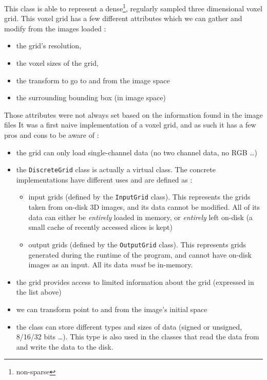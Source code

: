 {{		\vspace{\baselineskip}

		This class is able to represent a dense\footnote{non-sparse}, regularly sampled three dimensional voxel grid. This voxel grid has a few different attributes which we can gather and modify from the images loaded :\begin{itemize}
			\item the grid's resolution,
			\item the voxel sizes of the grid,
			\item the transform to go to and from the image space
			\item the surrounding bounding box (in image space)
		\end{itemize}\par

		\vspace{\baselineskip}

		Those attributes were not always set based on the information found in the image files It was a first naive implementation of a voxel grid, and as such it has a few pros and cons to be aware of :\begin{itemize}
			\item the grid can only load single-channel data (no two channel data, no RGB \ldots{})
			\item the \texttt{DiscreteGrid} class is actually a virtual class. The concrete implementations have different uses and are defined as :\begin{itemize}
					\item input grids (defined by the \texttt{InputGrid} class). This represents the grids taken from on-disk 3D images, and its data cannot be modified. All of its data can either be \textit{entirely} loaded in memory, or \textit{entirely} left on-disk (a small cache of recently accessed slices is kept)
					\item output grids (defined by the \texttt{OutputGrid} class). This represents grids generated during the runtime of the program, and cannot have on-disk images as an input. All its data \textit{must} be in-memory.
			\end{itemize}
			\item the grid provides access to limited information about the grid (expressed in the list above)
			\item we can transform point to and from the image's initial space
			\item the class can store different types and sizes of data (signed or unsigned, 8/16/32 bits \ldots{}). This type is also used in the classes that read the data from and write the data to the disk.
		\end{itemize}

}}
